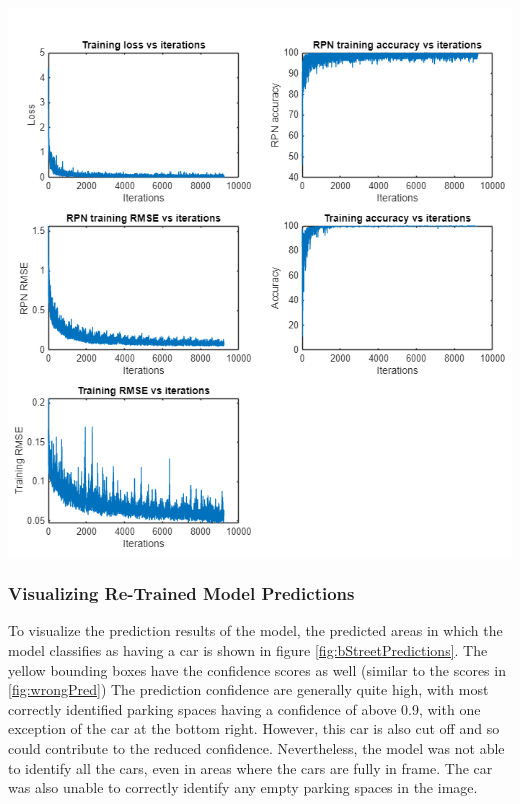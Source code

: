 \documentclass[man]{apa7}
\begin{document}
\begin{minipage}{\linewidth}
  \includegraphics[height=\textheight/2,width=\textwidth/1]{figures/modelIteration.png}
  \label{fig:modelIterations}
\end{minipage}

\subsubsection{Visualizing Re-Trained Model Predictions}

To visualize the prediction results of the model, the predicted areas in which the model classifies as having a car is shown in figure \ref{fig:bStreetPredictions}. The yellow bounding boxes have the confidence scores as well (similar to the scores in \ref{fig:wrongPred}) The prediction confidence are generally quite high, with most correctly identified parking spaces having a confidence of above 0.9, with one exception of the car at the bottom right. However, this car is also cut off and so could contribute to the reduced confidence. Nevertheless, the model was not able to identify all the cars, even in areas where the cars are fully in frame. The car was also unable to correctly identify any empty parking spaces in the image. 
\end{document}
